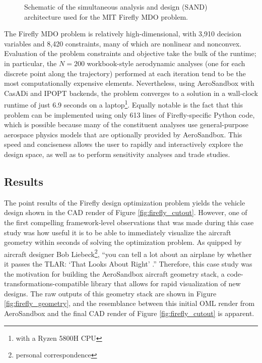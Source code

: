 \begin{figure}[H]
    \centering
    
    \caption{Schematic of the simultaneous analysis and design (SAND) architecture used for the MIT Firefly MDO problem.}
    \label{fig:sand}
\end{figure}

The Firefly MDO problem is relatively high-dimensional, with 3,910 decision variables and 8,420 constraints, many of which are nonlinear and nonconvex. Evaluation of the problem constraints and objective take the bulk of the runtime; in particular, the $N=200$ workbook-style aerodynamic analyses (one for each discrete point along the trajectory) performed at each iteration tend to be the most computationally expensive elements. Nevertheless, using AeroSandbox with CasADi and IPOPT backends, the problem converges to a solution in a wall-clock runtime of just 6.9 seconds on a laptop\footnote{with a Ryzen 5800H CPU}. Equally notable is the fact that this problem can be implemented using only 613 lines of Firefly-specific Python code, which is possible because many of the constituent analyses use general-purpose aerospace physics models that are optionally provided by AeroSandbox. This speed and conciseness allows the user to rapidly and interactively explore the design space, as well as to perform sensitivity analyses and trade studies.

\subsection{Results}

The point results of the Firefly design optimization problem yields the vehicle design shown in the CAD render of Figure \ref{fig:firefly_cutout}. However, one of the first compelling framework-level observations that was made during this case study was how useful it is to be able to immediately visualize the aircraft geometry within seconds of solving the optimization problem. As quipped by aircraft designer Bob Liebeck\footnote{personal correspondence}, ``you can tell a lot about an airplane by whether it passes the TLAR: `That Looks About Right' .'' Therefore, this case study was the motivation for building the AeroSandbox aircraft geometry stack, a code-transformations-compatible library that allows for rapid visualization of new designs. The raw outputs of this geometry stack are shown in Figure \ref{fig:firefly_geometry}, and the resemblance between this initial OML render from AeroSandbox and the final CAD render of Figure \ref{fig:firefly_cutout} is apparent.

